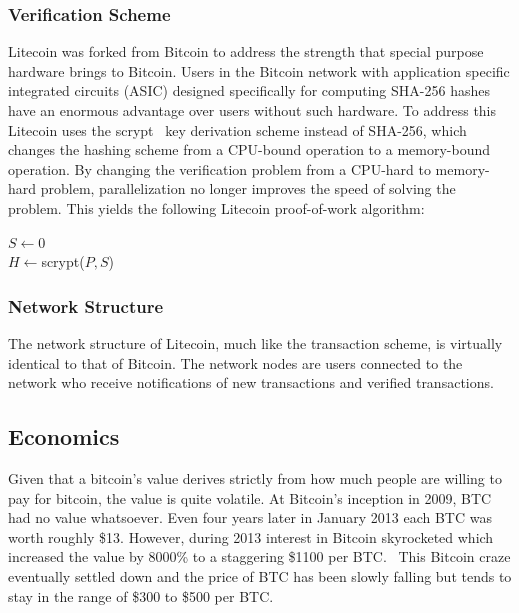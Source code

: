\documentclass[11pt]{article}
\begin{document}
\subsubsection{Verification Scheme}
Litecoin was forked from Bitcoin to address the strength that special purpose hardware brings to Bitcoin. Users in the
Bitcoin network with application specific integrated circuits (ASIC) designed specifically for computing SHA-256 hashes
have an enormous advantage over users without such hardware. To address this Litecoin uses the scrypt~\cite{percival09}
key derivation scheme instead of SHA-256, which changes the hashing scheme from a CPU-bound operation to a memory-bound
operation. By changing the verification problem from a CPU-hard to memory-hard problem, parallelization no longer
improves the speed of solving the problem. This yields the following Litecoin proof-of-work algorithm:
\begin{algorithm}
    $S \gets 0$\\
    $H \gets ${\sc scrypt($P, S$)}\\
\end{algorithm}

\subsubsection{Network Structure}
The network structure of Litecoin, much like the transaction scheme, is virtually identical to that of Bitcoin. The
network nodes are users connected to the network who receive notifications of new transactions and verified
transactions.

\subsection{Economics}
Given that a bitcoin's value derives strictly from how much people are willing to pay for bitcoin, the value is quite
volatile. At Bitcoin's inception in 2009, BTC had no value whatsoever. Even four years later in January 2013 each BTC
was worth roughly \$13. However, during 2013 interest in Bitcoin skyrocketed which increased the value by 8000\% to a
staggering \$1100 per BTC.~\cite{ciaian2014economics} This Bitcoin craze eventually settled down and the price of BTC
has been slowly falling but tends to stay in the range of \$300 to \$500 per BTC.
\end{document}
